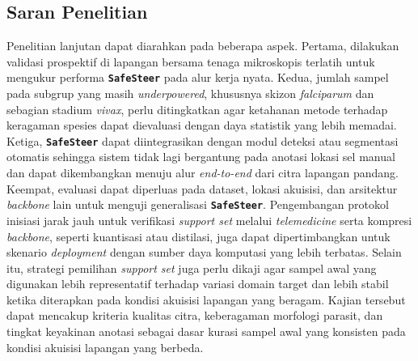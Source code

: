 \documentclass[conference]{IEEEtran}
\newcommand{\nama}[1]{\textbf{\texttt{#1}}}
\begin{document}
\subsection{Saran Penelitian}
Penelitian lanjutan dapat diarahkan pada beberapa aspek. Pertama, dilakukan validasi prospektif di lapangan bersama tenaga mikroskopis terlatih untuk mengukur performa \nama{SafeSteer} pada alur kerja nyata. Kedua, jumlah sampel pada subgrup yang masih \textit{underpowered}, khususnya skizon \textit{falciparum} dan sebagian stadium \textit{vivax}, perlu ditingkatkan agar ketahanan metode terhadap keragaman spesies dapat dievaluasi dengan daya statistik yang lebih memadai. Ketiga, \nama{SafeSteer} dapat diintegrasikan dengan modul deteksi atau segmentasi otomatis sehingga sistem tidak lagi bergantung pada anotasi lokasi sel manual dan dapat dikembangkan menuju alur \textit{end-to-end} dari citra lapangan pandang. Keempat, evaluasi dapat diperluas pada dataset, lokasi akuisisi, dan arsitektur \textit{backbone} lain untuk menguji generalisasi \nama{SafeSteer}. Pengembangan protokol inisiasi jarak jauh untuk verifikasi \textit{support set} melalui \textit{telemedicine} serta kompresi \textit{backbone}, seperti kuantisasi atau distilasi, juga dapat dipertimbangkan untuk skenario \textit{deployment} dengan sumber daya komputasi yang lebih terbatas. Selain itu, strategi pemilihan \textit{support set} juga perlu dikaji
agar sampel awal yang digunakan lebih representatif terhadap variasi
domain target dan lebih stabil ketika diterapkan pada kondisi akuisisi
lapangan yang beragam. Kajian tersebut dapat mencakup kriteria kualitas
citra, keberagaman morfologi parasit, dan tingkat keyakinan anotasi
sebagai dasar kurasi sampel awal yang konsisten pada kondisi akuisisi
lapangan yang berbeda.
\end{document}
